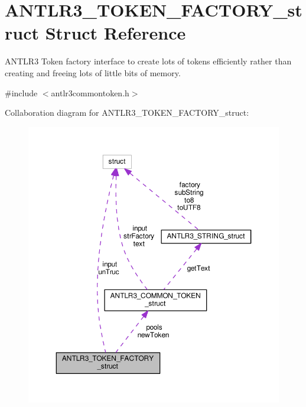 \hypertarget{struct_a_n_t_l_r3___t_o_k_e_n___f_a_c_t_o_r_y__struct}{\section{A\-N\-T\-L\-R3\-\_\-\-T\-O\-K\-E\-N\-\_\-\-F\-A\-C\-T\-O\-R\-Y\-\_\-struct Struct Reference}
\label{struct_a_n_t_l_r3___t_o_k_e_n___f_a_c_t_o_r_y__struct}
}


A\-N\-T\-L\-R3 Token factory interface to create lots of tokens efficiently rather than creating and freeing lots of little bits of memory.  




{\ttfamily \#include $<$antlr3commontoken.\-h$>$}



Collaboration diagram for A\-N\-T\-L\-R3\-\_\-\-T\-O\-K\-E\-N\-\_\-\-F\-A\-C\-T\-O\-R\-Y\-\_\-struct\-:
\nopagebreak
\begin{figure}[H]
\begin{center}
\leavevmode
\includegraphics[width=350pt]{struct_a_n_t_l_r3___t_o_k_e_n___f_a_c_t_o_r_y__struct__coll__graph}
\end{center}
\end{figure}
